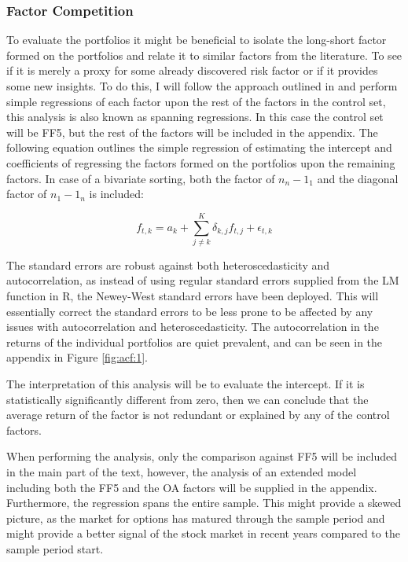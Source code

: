 \subsubsection{Factor Competition} \label{subsec:factorcomp_impl}

To evaluate the portfolios it might be beneficial to isolate the long-short factor formed on the portfolios and relate it to similar factors from the literature. To see if it is merely a proxy for some already discovered risk factor or if it provides some new insights. To do this, I will follow the approach outlined in \cite{fama2015five} and perform simple regressions of each factor upon the rest of the factors in the control set, this analysis is also known as spanning regressions. In this case the control set will be FF5, but the rest of the factors will be included in the appendix. The following equation outlines the simple regression of estimating the intercept and coefficients of regressing the factors formed on the portfolios upon the remaining factors. In case of a bivariate sorting, both the factor of $n_n - 1_1$ and the diagonal factor of $n_1 - 1_n$ is included:

\begin{equation}
	f_{t,k}=a_{k}+\sum_{j\neq k}^{K}\delta_{k,j}f_{t,j}+\epsilon_{t,k}
	\label{eq:factorcompetition}
\end{equation}

The standard errors are robust against both heteroscedasticity and autocorrelation, as instead of using regular standard errors supplied from the LM function in R, the Newey-West standard errors have been deployed. This will essentially correct the standard errors to be less prone to be affected by any issues with autocorrelation and heteroscedasticity. The autocorrelation in the returns of the individual portfolios are quiet prevalent, and can be seen in the appendix in Figure \ref{fig:acf:1}. 

The interpretation of this analysis will be to evaluate the intercept. If it is statistically significantly different from zero, then we can conclude that the average return of the factor is not redundant or explained by any of the control factors. 

When performing the analysis, only the comparison against FF5 will be included in the main part of the text, however, the analysis of an extended model including both the FF5 and the OA factors will be supplied in the appendix. Furthermore, the regression spans the entire sample. This might provide a skewed picture, as the market for options has matured through the sample period and might provide a better signal of the stock market in recent years compared to the sample period start.

